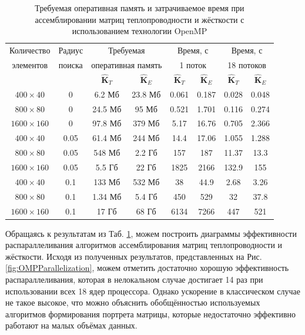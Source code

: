 \begin{table}[htbp]
    \centering
    \begin{threeparttable}%
        \caption{Требуемая оперативная память и затрачиваемое время при ассемблировании матриц теплопроводности и жёсткости с использованием технологии OpenMP}\label{tab:OpenMP}
        \begin{tabular}{|c|c|c|c|c|c|c|c|}
	\hline
	Количество & Радиус & \multicolumn{2}{c|}{Требуемая}   & \multicolumn{2}{c|}{Время, с} & \multicolumn{2}{c|}{Время, с} \\
	элементов  & поиска & \multicolumn{2}{c|}{оперативная память} & \multicolumn{2}{c|}{1 поток}  & \multicolumn{2}{c|}{18 потоков} \\
	\cline{3-8}
	      &        & $\widehat{\textbf{K}}_T$ & $\widehat{\textbf{K}}_E$ & $\widehat{\textbf{K}}_T$ & $\widehat{\textbf{K}}_E$ & $\widehat{\textbf{K}}_T$ & $\widehat{\textbf{K}}_E$ \\
	\hline
	$400 \times 40$   & 0    & 6.2 Мб  & 23.8 Мб & 0.061 & 0.187 & 0.028 & 0.048 \\
	\hline
	$800 \times 80$   & 0    & 24.5 Мб & 95 Мб   & 0.521 & 1.701 & 0.116 & 0.274 \\
	\hline
	$1600 \times 160$ & 0    & 97.8 Мб & 379 Мб  & 5.17  & 16.76 & 0.705 & 2.366 \\
	\hline
	$400 \times 40$   & 0.05 & 61.4 Мб & 244 Мб  & 14.4  & 17.06 & 1.055 & 1.288 \\
	\hline
	$800 \times 80$   & 0.05 & 548 Мб  & 2.2 Гб  & 157   & 187   & 11.37 & 13.3  \\
	\hline
	$1600 \times 160$ & 0.05 & 5.5 Гб  & 22 Гб   & 1825  & 2166  & 132.9 & 155   \\
	\hline
	$400 \times 40$   & 0.1  & 133 Мб  & 532 Мб  & 38    & 44.9  & 2.68  & 3.26  \\
	\hline
	$800 \times 80$   & 0.1  & 1.34 Мб & 5.4 Гб  & 450   & 529   & 32    & 37.8  \\
	\hline
	$1600 \times 160$ & 0.1  & 17 Гб   & 68 Гб   & 6134  & 7266  & 447   & 521   \\
	\hline
        \end{tabular}
    \end{threeparttable}
\end{table}

Обращаясь к результатам из Таб. \ref{tab:OpenMP}, можем построить диаграммы эффективности распараллеливания алгоритмов ассемблирования матриц теплопроводности и жёсткости. Исходя из полученных результатов, представленных на Рис. \ref{fig:OMPParallelization}, можем отметить достаточно хорошую эффективность распараллеливания, которая в нелокальном случае достигает 14 раз при использовании всех 18 ядер процессора. Однако ускорение в классическом случае не такое высокое, что можно объяснить обобщённостью используемых алгоритмов формирования портрета матрицы, которые недостаточно эффективно работают на малых объёмах данных.

